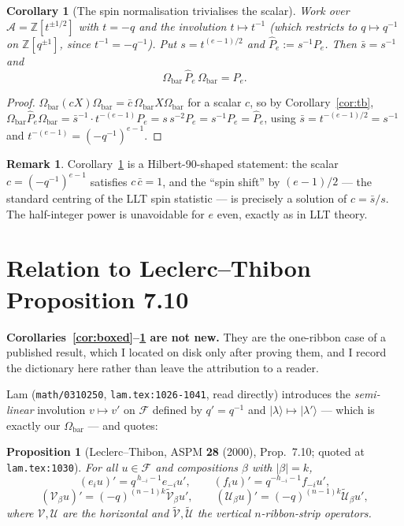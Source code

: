 \documentclass[11pt]{article}
\theoremstyle{plain}
\newtheorem{proposition}[theorem]{Proposition}
\newtheorem{corollary}[theorem]{Corollary}
\theoremstyle{definition}
\newtheorem{remark}[theorem]{Remark}
\newcommand{\F}{\mathcal{F}}
\newcommand{\Om}{\Omega}
\newcommand{\Ombar}{\Om_{\mathrm{bar}}}
\begin{document}
\begin{corollary}[The spin normalisation trivialises the scalar]\label{cor:spin}
Work over $\mathcal{A}=\mathbb{Z}[t^{\pm1/2}]$ with $t=-q$ and the involution
$t\mapsto t^{-1}$ (which restricts to $q\mapsto q^{-1}$ on
$\mathbb{Z}[q^{\pm1}]$, since $t^{-1}=-q^{-1}$).  Put
$s=t^{(e-1)/2}$ and $\widehat P_e:=s^{-1}P_e$.  Then $\bar s=s^{-1}$ and
\[
  \Ombar\,\widehat P_e\,\Ombar=\widehat P_e .
\]
\end{corollary}
\begin{proof}
$\Ombar(cX)\Ombar=\bar c\,\Ombar X\Ombar$ for a scalar $c$, so by
Corollary~\ref{cor:tb}, $\Ombar\widehat P_e\Ombar=
\bar s^{-1}\cdot t^{-(e-1)}P_e=s\,s^{-2}P_e=s^{-1}P_e=\widehat P_e$,
using $\bar s=t^{-(e-1)/2}=s^{-1}$ and $t^{-(e-1)}=(-q^{-1})^{e-1}$.
\end{proof}

\begin{remark}
Corollary~\ref{cor:spin} is a Hilbert-90-shaped statement: the scalar
$c=(-q^{-1})^{e-1}$ satisfies $c\,\bar c=1$, and the ``spin shift'' by
$(e-1)/2$ --- the standard centring of the LLT spin statistic --- is
precisely a solution of $c=\bar s/s$.  The half-integer power is unavoidable
for $e$ even, exactly as in LLT theory.
\end{remark}

\section{Relation to Leclerc--Thibon Proposition 7.10}
\label{sec:LT}

\textbf{Corollaries~\ref{cor:boxed}--\ref{cor:spin} are not new.}  They are
the one-ribbon case of a published result, which I located on disk only after
proving them, and I record the dictionary here rather than leave the
attribution to a reader.

Lam (\texttt{math/0310250}, \verb|lam.tex:1026-1041|, read directly)
introduces the \emph{semi-linear} involution $v\mapsto v'$ on $\F$ defined by
$q'=q^{-1}$ and $\lvert\lambda\rangle\mapsto\lvert\lambda'\rangle$ --- which
is exactly our $\Ombar$ --- and quotes:

\begin{proposition}[Leclerc--Thibon, ASPM \textbf{28} (2000), Prop.~7.10;
quoted at \texttt{lam.tex:1030}]\label{prop:LT710}
For all $u\in\F$ and compositions $\beta$ with $|\beta|=k$,
\[
  (e_iu)'=q^{\,h_{-i}-1}e_{-i}u',\qquad
  (f_iu)'=q^{-h_{-i}-1}f_{-i}u',
\]
\[
  (\mathcal{V}_\beta u)'=(-q)^{(n-1)k}\widetilde{\mathcal{V}}_\beta u',
  \qquad
  (\mathcal{U}_\beta u)'=(-q)^{(n-1)k}\widetilde{\mathcal{U}}_\beta u',
\]
where $\mathcal{V},\mathcal{U}$ are the horizontal and
$\widetilde{\mathcal{V}},\widetilde{\mathcal{U}}$ the vertical
$n$-ribbon-strip operators.
\end{proposition}
\end{document}
